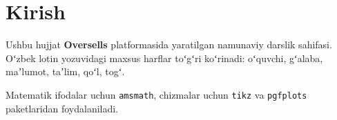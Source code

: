 \section{Kirish}

Ushbu hujjat \textbf{Oversells} platformasida yaratilgan namunaviy darslik
sahifasi. Oʻzbek lotin yozuvidagi maxsus harflar toʻgʻri koʻrinadi:
oʻquvchi, gʻalaba, maʼlumot, taʼlim, qoʻl, togʻ.

Matematik ifodalar uchun \texttt{amsmath}, chizmalar uchun \texttt{tikz}
va \texttt{pgfplots} paketlaridan foydalaniladi.
